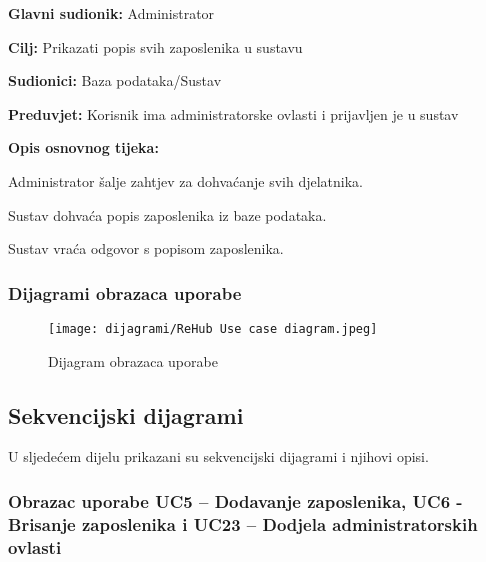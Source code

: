                 \noindent {}
					\begin{packed_item}
	
						\item \textbf{Glavni sudionik: }Administrator
						\item  \textbf{Cilj:} Prikazati popis svih zaposlenika u sustavu
						\item  \textbf{Sudionici:} Baza podataka/Sustav
						\item  \textbf{Preduvjet:} Korisnik ima administratorske ovlasti i prijavljen je u sustav
						\item  \textbf{Opis osnovnog tijeka:}
						
						\item[] \begin{packed_enum}
	
							\item Administrator šalje zahtjev za dohvaćanje svih djelatnika.
							\item Sustav dohvaća popis zaposlenika iz baze podataka.
                            \item Sustav vraća odgovor s popisom zaposlenika.
	
						\end{packed_enum}
						
						
					\end{packed_item}
     
				\subsubsection{Dijagrami obrazaca uporabe}
					
					\begin{figure}[H]
			         \texttt{[image: dijagrami/ReHub Use case diagram.jpeg]}
			         \centering
			         \caption{Dijagram obrazaca uporabe}
			         \label{fig:UseCaseDiagram}
		          \end{figure}
				\eject		
				
			\subsection{Sekvencijski dijagrami}
				
				U sljedećem dijelu prikazani su sekvencijski dijagrami i njihovi opisi.
                \subsubsection{Obrazac uporabe UC5 – Dodavanje zaposlenika, UC6 - Brisanje zaposlenika i UC23 – Dodjela administratorskih ovlasti}

